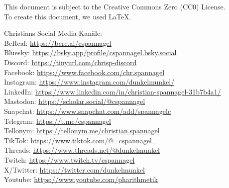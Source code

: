 \documentclass[12pt,a4paper,oneside,ngerman]{article}
\begin{document}
\tiny{This document is subject to the Creative Commons Zero (CC0) License.
\\ To create this document, we used \LaTeX{}.

Christians Social Media Kanäle:\\
BeReal: \url{https://bere.al/cspannagel}\\
Bluesky: \url{https://bsky.app/profile/cspannagel.bsky.social}\\
Discord: \url{https://tinyurl.com/chrisp-discord}\\
Facebook: \url{https://www.facebook.com/chr.spannagel}\\
Instagram: \url{https://www.instagram.com/dunkelmunkel/}\\
LinkedIn: \url{https://www.linkedin.com/in/christian-spannagel-31b7b4a1/}\\
Mastodon: \url{https://scholar.social/@cspannagel}\\
Snapchat: \url{https://www.snapchat.com/add/spannagelc}\\
Telegram: \url{https://t.me/cspannagel}\\
Tellonym: \url{https://tellonym.me/christian.spannagel}\\
TikTok: \url{https://www.tiktok.com/@_cspannagel_}\\
Threads: \url{https://www.threads.net/@dunkelmunkel}\\
Twitch: \url{https://www.twitch.tv/cspannagel}\\
X/Twitter: \url{https://twitter.com/dunkelmunkel}\\
Youtube: \url{https://www.youtube.com/pharithmetik}}\\

\end{document}
